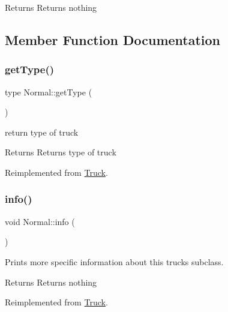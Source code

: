 \begin{DoxyReturn}{Returns}
Returns nothing 
\end{DoxyReturn}


\subsection{Member Function Documentation}
\mbox{\label{class_normal_ae34be8332ea67df5fb0ae9b274884748}} 
\subsubsection{\texorpdfstring{get\+Type()}{getType()}}
{\footnotesize\ttfamily type Normal\+::get\+Type (\begin{DoxyParamCaption}{ }\end{DoxyParamCaption})\hspace{0.3cm}{\ttfamily [virtual]}}



return type of truck 

\begin{DoxyReturn}{Returns}
Returns type of truck 
\end{DoxyReturn}


Reimplemented from \hyperlink{class_truck_a24406caf4d09be7f3eff069ce6bc015b}{Truck}.

\mbox{\label{class_normal_ade6add2ee09e701113534c97e2a03307}} 
\subsubsection{\texorpdfstring{info()}{info()}}
{\footnotesize\ttfamily void Normal\+::info (\begin{DoxyParamCaption}{ }\end{DoxyParamCaption})\hspace{0.3cm}{\ttfamily [virtual]}}



Prints more specific information about this truck\textquotesingle{}s subclass. 

\begin{DoxyReturn}{Returns}
Returns nothing 
\end{DoxyReturn}


Reimplemented from \hyperlink{class_truck_a38f09eab2822524e355ecf6d0a13f7de}{Truck}.



